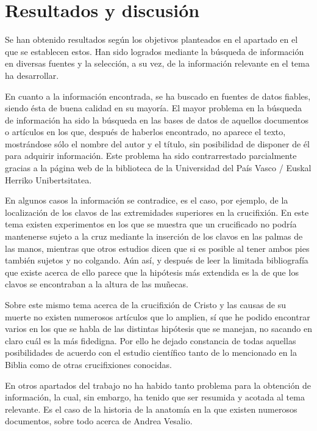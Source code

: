 \section{Resultados y discusión}

Se han obtenido resultados según los objetivos planteados en el apartado en el que se establecen estos. Han sido logrados mediante la búsqueda de información en diversas fuentes y la selección, a su vez, de la información relevante en el tema ha desarrollar.

En cuanto a la información encontrada, se ha buscado en fuentes de datos fiables, siendo ésta de buena calidad en su mayoría. El mayor problema en la búsqueda de información ha sido la búsqueda en las bases de datos de aquellos documentos o artículos en los que, después de haberlos encontrado, no aparece el texto, mostrándose sólo el nombre del autor y el título, sin posibilidad de disponer de él para adquirir información. Este problema ha sido contrarrestado parcialmente gracias a la página web de la biblioteca de la Universidad del País Vasco / Euskal Herriko Unibertsitatea.

En algunos casos la información se contradice, es el caso, por ejemplo, de la localización de los clavos de las extremidades superiores en la crucifixión. En este tema existen experimentos en los que se muestra que un crucificado no podría mantenerse sujeto a la cruz mediante la inserción de los clavos en las palmas de las manos, mientras que otros estudios dicen que si es posible al tener ambos pies también sujetos y no colgando. Aún así, y después de leer la limitada bibliografía que existe acerca de ello parece que la hipótesis más extendida es la de que los clavos se encontraban a la altura de las muñecas.

Sobre este mismo tema acerca de la crucifixión de Cristo y las causas de su muerte no existen numerosos artículos que lo amplien, sí que he podido encontrar varios en los que se habla de las distintas hipótesis que se manejan, no sacando en claro cuál es la más fidedigna. Por ello he dejado constancia de todas aquellas posibilidades de acuerdo con el estudio científico tanto de lo mencionado en la Biblia como de otras crucifixiones conocidas.

En otros apartados del trabajo no ha habido tanto problema para la obtención de información, la cual, sin embargo, ha tenido que ser resumida y acotada al tema relevante. Es el caso de la historia de la anatomía en la que existen numerosos documentos, sobre todo acerca de Andrea Vesalio.

